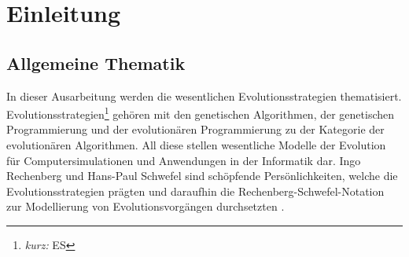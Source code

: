 
\section{Einleitung}

\subsection{Allgemeine Thematik}

In dieser Ausarbeitung werden die wesentlichen Evolutionsstrategien thematisiert.
Evolutionsstrategien\footnote{\textit{kurz:} ES} gehören mit den genetischen Algorithmen, der genetischen Programmierung und der evolutionären Programmierung zu der Kategorie der evolutionären Algorithmen. All diese stellen wesentliche Modelle der Evolution für Computersimulationen und Anwendungen in der Informatik dar.
Ingo Rechenberg und Hans-Paul Schwefel sind schöpfende Persönlichkeiten, welche die Evolutionsstrategien prägten und daraufhin die Rechenberg-Schwefel-Notation zur Modellierung von Evolutionsvorgängen durchsetzten \cite[S.~141]{schoeneburg}.

